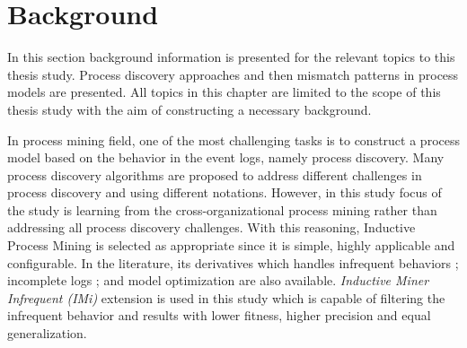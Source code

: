 \section{Background}
\label{sec:background}

In this section background information is presented for the relevant topics to this thesis study. Process discovery approaches and then mismatch patterns in process models are presented. All topics in this chapter are limited to the scope of this thesis study with the aim of constructing a necessary background.

In process mining field, one of the most challenging tasks is to construct a process model based on the behavior in the event logs, namely process discovery. Many process discovery algorithms are proposed to address different challenges in process discovery and using different notations. However, in this study focus of the study is learning from the cross-organizational process mining rather than addressing all process discovery challenges. With this reasoning, Inductive Process Mining \cite{leemans2013discovering} is selected as appropriate since it is simple, highly applicable and configurable. In the literature, its derivatives which handles infrequent behaviors \cite{leemans2014discoveringinfrequent}; incomplete logs \cite{leemans2014discoveringincomplete}; and model optimization \cite{weidlich2012profiles} are also available. \textit{Inductive Miner Infrequent (IMi)} \cite{leemans2014discoveringinfrequent} extension is used in this study which is capable of filtering the infrequent behavior and results with lower fitness, higher precision and equal generalization.

